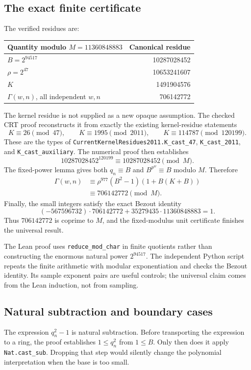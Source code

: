 \documentclass[11pt]{article}
\newcommand{\code}[1]{\nolinkurl{#1}}
\begin{document}
\subsection{The exact finite certificate}
The verified residues are:
\begin{center}
\begin{tabular}{@{}lr@{}}
\toprule
Quantity modulo \(M=11360848883\) & Canonical residue\\
\midrule
\(B=2^{94517}\) & 10287028452\\
\(\rho=2^{47}\) & 10653241607\\
\(K\) & 1491904576\\
\(\Gamma(w,n)\), all independent \(w,n\) & 706142772\\
\bottomrule
\end{tabular}
\end{center}
The kernel residue is not supplied as a new opaque assumption. The checked
CRT proof reconstructs it from exactly the existing kernel-residue statements
\[
 K\equiv26\pmod{47},\qquad
 K\equiv1995\pmod{2011},\qquad
 K\equiv114787\pmod{120199}.
\]
These are the types of
\code{CurrentKernelResidues2011.K_cast_47},
\code{K_cast_2011}, and \code{K_cast_auxiliary}.\cite{kernelresidues}
The numerical proof then establishes
\[
 10287028452^{120199}\equiv10287028452\pmod M.
\]
The fixed-power lemma gives both \(q_n\equiv B\) and
\(B^{p^w}\equiv B\) modulo \(M\). Therefore
\begin{align*}
 \Gamma(w,n)
 &\equiv \rho^{977}(B^2-1)(1+B(K+B))\\
 &\equiv 706142772\pmod M.
\end{align*}
Finally, the small integers satisfy the exact Bezout identity
\[
 (-567596732)\cdot706142772
 +35279435\cdot11360848883=1.
\]
Thus \(706142772\) is coprime to \(M\), and the fixed-modulus unit certificate
finishes the universal result.

The Lean proof uses \code{reduce_mod_char} in finite quotients rather than
constructing the enormous natural power \(2^{94517}\). The independent Python
script repeats the finite arithmetic with modular exponentiation and checks the
Bezout identity. Its sample exponent pairs are useful controls; the universal
claim comes from the Lean induction, not from sampling.

\subsection{Natural subtraction and boundary cases}
The expression \(q_n^2-1\) is natural subtraction. Before transporting the
expression to a ring, the proof establishes \(1\le q_n^2\) from \(1\le B\).
Only then does it apply \code{Nat.cast_sub}. Dropping that step would silently
change the polynomial interpretation when the base is too small.
\end{document}
